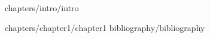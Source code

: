 \documentclass[a4paper,12pt]{report}
\author{Παπαντωνακης Σταυρος}
\date{7/4/2020}
\begin{document}
	
		
	\tableofcontents		
	\newpage
	 {chapters/intro/intro}
	
	 {chapters/chapter1/chapter1}
	 {bibliography/bibliography}
\end{document}

